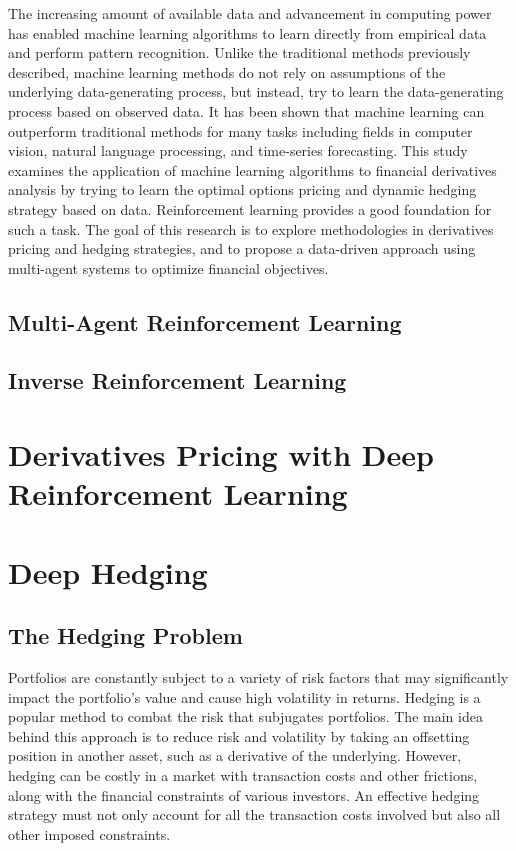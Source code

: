 The increasing amount of available data and advancement in computing power has enabled machine learning algorithms to learn directly from empirical data and perform pattern recognition. Unlike the traditional methods previously described, machine learning methods do not rely on assumptions of the underlying data-generating process, but instead, try to learn the data-generating process based on observed data. It has been shown that machine learning can outperform traditional methods for many tasks including fields in computer vision, natural language processing, and time-series forecasting. This study examines the application of machine learning algorithms to financial derivatives analysis by trying to learn the optimal options pricing and dynamic hedging strategy based on data. Reinforcement learning provides a good foundation for such a task. The goal of this research is to explore methodologies in derivatives pricing and hedging strategies, and to propose a data-driven approach using multi-agent systems to optimize financial objectives.

\subsection{Multi-Agent Reinforcement Learning}

\subsection{Inverse Reinforcement Learning}

\section{Derivatives Pricing with Deep Reinforcement Learning}

\section{Deep Hedging}

\subsection{The Hedging Problem}

Portfolios are constantly subject to a variety of risk factors that may significantly impact the portfolio's value and cause high volatility in returns. Hedging is a popular method to combat the risk that subjugates portfolios. The main idea behind this approach is to reduce risk and volatility by taking an offsetting position in another asset, such as a derivative of the underlying. However, hedging can be costly in a market with transaction costs and other frictions, along with the financial constraints of various investors. An effective hedging strategy must not only account for all the transaction costs involved but also all other imposed constraints.

